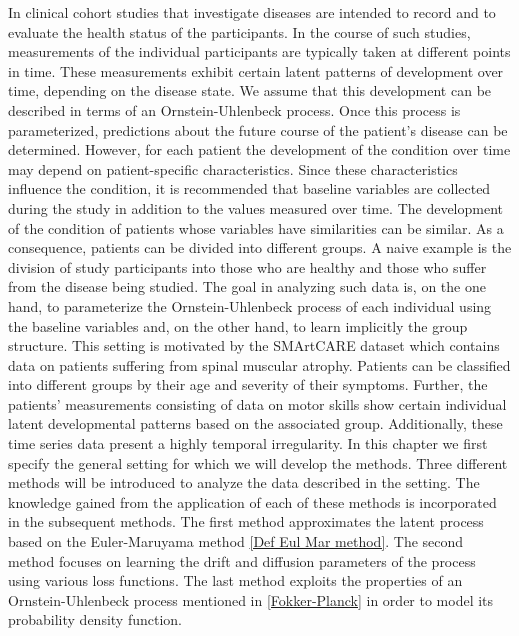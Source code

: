 \documentclass[11pt,titlepage]{article}
\theoremstyle{definition}
\theoremstyle{remark}
\begin{document}
	In clinical cohort studies that investigate diseases are intended to record and to evaluate the health status of the participants. In the course of such studies, measurements of the individual participants are typically taken at different points in time. These measurements exhibit certain latent patterns of development over time, depending on the disease state. We assume that this development can be described in terms of an Ornstein-Uhlenbeck process. Once this process is parameterized, predictions about the future course of the patient's disease can be determined. However, for each patient the development of the condition over time may depend on patient-specific characteristics. Since these characteristics influence the condition, it is recommended that baseline variables are collected during the study in addition to the values measured over time. The development of the condition of patients whose variables have similarities can be similar. As a consequence, patients can be divided into different groups. A naive example is the division of study participants into those who are healthy and those who suffer from the disease being studied. The goal in analyzing such data is, on the one hand, to parameterize the Ornstein-Uhlenbeck process of each individual using the baseline variables and, on the other hand, to learn implicitly the group structure. This setting is motivated by the SMArtCARE dataset which contains data on patients suffering from spinal muscular atrophy. Patients can be classified into different groups by their age and severity of their symptoms. Further, the patients' measurements consisting of data on motor skills show certain individual latent developmental patterns based on the associated group. %
	Additionally, these time series data present a highly temporal irregularity.
	In this chapter we first specify the general setting for which we will develop the methods. Three different methods will be introduced to analyze the data described in the setting. The knowledge gained from the application of each of these methods is incorporated in the subsequent methods. The first method approximates the latent process based on the Euler-Maruyama method \ref{Def Eul Mar method}. The second method focuses on learning the drift and diffusion parameters of the process using various loss functions. The last method exploits the properties of an Ornstein-Uhlenbeck process mentioned in \ref{Fokker-Planck} in order to model its probability density function. 
	
\end{document}
